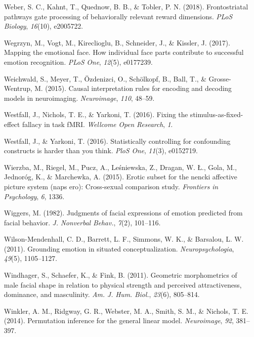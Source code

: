 \documentclass[11pt,american,a4paper,oneside,]{memoir} %
\begin{document}
\leavevmode\hypertarget{ref-weber2018frontostriatal}{}%
Weber, S. C., Kahnt, T., Quednow, B. B., \& Tobler, P. N. (2018). Frontostriatal pathways gate processing of behaviorally relevant reward dimensions. \emph{PLoS Biology}, \emph{16}(10), e2005722.

\leavevmode\hypertarget{ref-Wegrzyn2017-ke}{}%
Wegrzyn, M., Vogt, M., Kireclioglu, B., Schneider, J., \& Kissler, J. (2017). Mapping the emotional face. How individual face parts contribute to successful emotion recognition. \emph{PLoS One}, \emph{12}(5), e0177239.

\leavevmode\hypertarget{ref-Weichwald2015-aj}{}%
Weichwald, S., Meyer, T., Özdenizci, O., Schölkopf, B., Ball, T., \& Grosse-Wentrup, M. (2015). Causal interpretation rules for encoding and decoding models in neuroimaging. \emph{Neuroimage}, \emph{110}, 48--59.

\leavevmode\hypertarget{ref-westfall2016fixing}{}%
Westfall, J., Nichols, T. E., \& Yarkoni, T. (2016). Fixing the stimulus-as-fixed-effect fallacy in task fMRI. \emph{Wellcome Open Research}, \emph{1}.

\leavevmode\hypertarget{ref-westfall2016statistically}{}%
Westfall, J., \& Yarkoni, T. (2016). Statistically controlling for confounding constructs is harder than you think. \emph{PloS One}, \emph{11}(3), e0152719.

\leavevmode\hypertarget{ref-wierzba2015erotic}{}%
Wierzba, M., Riegel, M., Pucz, A., Leśniewska, Z., Dragan, W. Ł., Gola, M., Jednoróg, K., \& Marchewka, A. (2015). Erotic subset for the nencki affective picture system (naps ero): Cross-sexual comparison study. \emph{Frontiers in Psychology}, \emph{6}, 1336.

\leavevmode\hypertarget{ref-Wiggers1982-na}{}%
Wiggers, M. (1982). Judgments of facial expressions of emotion predicted from facial behavior. \emph{J. Nonverbal Behav.}, \emph{7}(2), 101--116.

\leavevmode\hypertarget{ref-wilson2011grounding}{}%
Wilson-Mendenhall, C. D., Barrett, L. F., Simmons, W. K., \& Barsalou, L. W. (2011). Grounding emotion in situated conceptualization. \emph{Neuropsychologia}, \emph{49}(5), 1105--1127.

\leavevmode\hypertarget{ref-Windhager2011-ik}{}%
Windhager, S., Schaefer, K., \& Fink, B. (2011). Geometric morphometrics of male facial shape in relation to physical strength and perceived attractiveness, dominance, and masculinity. \emph{Am. J. Hum. Biol.}, \emph{23}(6), 805--814.

\leavevmode\hypertarget{ref-winkler2014permutation}{}%
Winkler, A. M., Ridgway, G. R., Webster, M. A., Smith, S. M., \& Nichols, T. E. (2014). Permutation inference for the general linear model. \emph{Neuroimage}, \emph{92}, 381--397.
\end{document}
